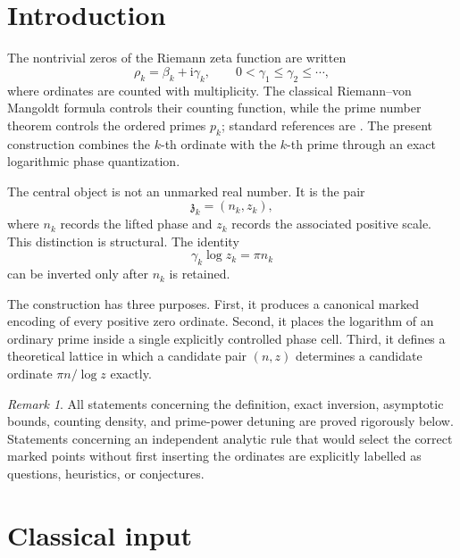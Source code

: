 \documentclass[11pt]{amsart}
\numberwithin{equation}{section}
\theoremstyle{plain}
\theoremstyle{definition}
\theoremstyle{remark}
\newtheorem{remark}[theorem]{Remark}
\newcommand{\ii}{\mathrm i}
\begin{document}
\section{Introduction}
\label{sec:introduction}

The nontrivial zeros of the Riemann zeta function are written
\begin{equation}
 \rho_k=\beta_k+\ii\gamma_k,
 \qquad
 0<\gamma_1\leq\gamma_2\leq\cdots,
 \label{eq:ordered_zeros}
\end{equation}
where ordinates are counted with multiplicity.  The classical
Riemann--von Mangoldt formula controls their counting function, while the
prime number theorem controls the ordered primes $p_k$; standard references
are \cite{Titchmarsh1986,Ingham1932}.  The present construction combines the
$k$-th ordinate with the $k$-th prime through an exact logarithmic phase
quantization.

The central object is not an unmarked real number.  It is the pair
\begin{equation}
 \mathfrak z_k=(n_k,z_k),
 \label{eq:introduction_marked_pair}
\end{equation}
where $n_k$ records the lifted phase and $z_k$ records the associated
positive scale.  This distinction is structural.  The identity
\begin{equation}
 \gamma_k\log z_k=\pi n_k
 \label{eq:introduction_quantization}
\end{equation}
can be inverted only after $n_k$ is retained.

The construction has three purposes.  First, it produces a canonical marked
encoding of every positive zero ordinate.  Second, it places the logarithm of
an ordinary prime inside a single explicitly controlled phase cell.  Third,
it defines a theoretical lattice in which a candidate pair $(n,z)$ determines
a candidate ordinate $\pi n/\log z$ exactly.

\begin{remark}
\label{rem:status_convention}
All statements concerning the definition, exact inversion, asymptotic bounds,
counting density, and prime-power detuning are proved rigorously below.
Statements concerning an independent analytic rule that would select the
correct marked points without first inserting the ordinates are explicitly
labelled as questions, heuristics, or conjectures.
\end{remark}

\section{Classical input}
\label{sec:classical_input}
\end{document}

